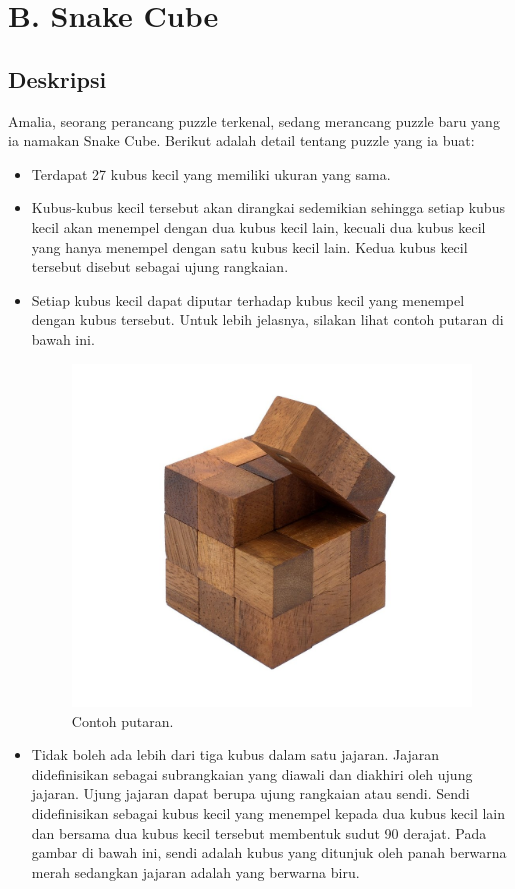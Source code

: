 \documentclass{article}
\begin{document}
\pagestyle{fancy}
\fancyhf{}
\renewcommand{\headrulewidth}{0pt}

\section*{\hfil B. Snake Cube\hfil}

\subsection*{Deskripsi}

\par\noindent Amalia, seorang perancang puzzle terkenal, sedang merancang puzzle baru yang ia namakan Snake Cube. Berikut adalah detail tentang puzzle yang ia buat:

\begin{itemize}
	\item Terdapat 27 kubus kecil yang memiliki ukuran yang sama.
	\item Kubus-kubus kecil tersebut akan dirangkai sedemikian sehingga setiap kubus kecil akan menempel dengan dua kubus kecil lain, kecuali dua kubus kecil yang hanya menempel dengan satu kubus kecil lain. Kedua kubus kecil tersebut disebut sebagai ujung rangkaian.
	\item Setiap kubus kecil dapat diputar terhadap kubus kecil yang menempel dengan kubus tersebut. Untuk lebih jelasnya, silakan lihat contoh putaran di bawah ini.

  \begin{figure}[h!]
    \centering
    \includegraphics[width=0.2\linewidth]{putaran.jpg}
    \caption{Contoh putaran.}
  \end{figure}


	\item Tidak boleh ada lebih dari tiga kubus dalam satu jajaran. Jajaran didefinisikan sebagai subrangkaian yang diawali dan diakhiri oleh ujung jajaran. Ujung jajaran dapat berupa ujung rangkaian atau sendi. Sendi didefinisikan sebagai kubus kecil yang menempel kepada dua kubus kecil lain dan bersama dua kubus kecil tersebut membentuk sudut 90 derajat. Pada gambar di bawah ini, sendi adalah kubus yang ditunjuk oleh panah berwarna merah sedangkan jajaran adalah yang berwarna biru.


\end{itemize}
\end{document}
